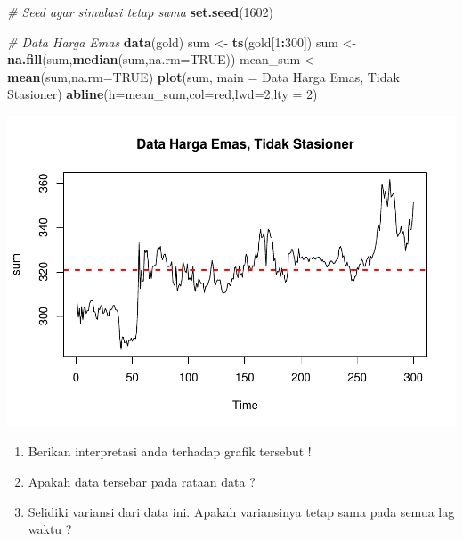 \documentclass[
]{book}
\newenvironment{Shaded}{\begin{snugshade}}{\end{snugshade}}
\newcommand{\AttributeTok}[1]{\textcolor[rgb]{0.13,0.29,0.53}{#1}}
\newcommand{\CommentTok}[1]{\textcolor[rgb]{0.56,0.35,0.01}{\textit{#1}}}
\newcommand{\ConstantTok}[1]{\textcolor[rgb]{0.56,0.35,0.01}{#1}}
\newcommand{\DecValTok}[1]{\textcolor[rgb]{0.00,0.00,0.81}{#1}}
\newcommand{\FunctionTok}[1]{\textcolor[rgb]{0.13,0.29,0.53}{\textbf{#1}}}
\newcommand{\NormalTok}[1]{#1}
\newcommand{\OtherTok}[1]{\textcolor[rgb]{0.56,0.35,0.01}{#1}}
\newcommand{\SpecialCharTok}[1]{\textcolor[rgb]{0.81,0.36,0.00}{\textbf{#1}}}
\newcommand{\StringTok}[1]{\textcolor[rgb]{0.31,0.60,0.02}{#1}}
\begin{document}
\begin{Shaded}
\begin{Highlighting}[]
\CommentTok{\# Seed agar simulasi tetap sama}
\FunctionTok{set.seed}\NormalTok{(}\DecValTok{1602}\NormalTok{)}

\CommentTok{\# Data Harga Emas}
\FunctionTok{data}\NormalTok{(gold)}
\NormalTok{sum }\OtherTok{\textless{}{-}} \FunctionTok{ts}\NormalTok{(gold[}\DecValTok{1}\SpecialCharTok{:}\DecValTok{300}\NormalTok{])}
\NormalTok{sum }\OtherTok{\textless{}{-}} \FunctionTok{na.fill}\NormalTok{(sum,}\FunctionTok{median}\NormalTok{(sum,}\AttributeTok{na.rm=}\ConstantTok{TRUE}\NormalTok{))}
\NormalTok{mean\_sum }\OtherTok{\textless{}{-}} \FunctionTok{mean}\NormalTok{(sum,}\AttributeTok{na.rm=}\ConstantTok{TRUE}\NormalTok{)}
\FunctionTok{plot}\NormalTok{(sum, }\AttributeTok{main =} \StringTok{\textquotesingle{}Data Harga Emas, Tidak Stasioner\textquotesingle{}}\NormalTok{)}
\FunctionTok{abline}\NormalTok{(}\AttributeTok{h=}\NormalTok{mean\_sum,}\AttributeTok{col=}\StringTok{\textquotesingle{}red\textquotesingle{}}\NormalTok{,}\AttributeTok{lwd=}\DecValTok{2}\NormalTok{,}\AttributeTok{lty =} \DecValTok{2}\NormalTok{)}
\end{Highlighting}
\end{Shaded}

\begin{center}\includegraphics{_main_files/figure-latex/Contoh Plot yang Stasioner an Tidak Stasioner-1} \end{center}
\begin{jp}{}{}
\begin{enumerate}
\item Berikan interpretasi anda terhadap grafik tersebut !  
\item Apakah data tersebar pada rataan data ?  
\item Selidiki variansi dari data ini. Apakah variansinya tetap sama pada semua lag waktu ?
\end{enumerate}
\end{jp}
\end{document}
